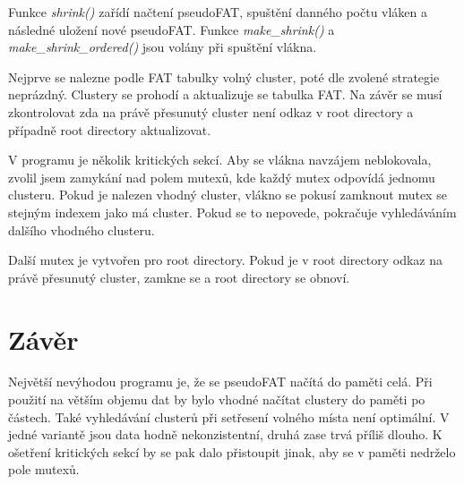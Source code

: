 Funkce \emph{shrink()} zařídí načtení pseudoFAT, spuštění danného počtu vláken a následné uložení nové pseudoFAT. Funkce \emph{make\_shrink()} a \emph{make\_shrink\_ordered()} jsou volány při spuštění vlákna.

Nejprve se nalezne podle FAT tabulky volný cluster, poté dle zvolené strategie neprázdný. Clustery se prohodí a aktualizuje se tabulka FAT. Na závěr se musí zkontrolovat zda na právě přesunutý cluster není odkaz v root directory a případně root directory aktualizovat.

V programu je několik kritických sekcí. Aby se vlákna navzájem neblokovala, zvolil jsem zamykání nad polem mutexů, kde každý mutex odpovídá jednomu clusteru. Pokud je nalezen vhodný cluster, vlákno se pokusí zamknout mutex se stejným indexem jako má cluster. Pokud se to nepovede, pokračuje vyhledáváním dalšího vhodného clusteru.

Další mutex je vytvořen pro root directory. Pokud je v root directory odkaz na právě přesunutý cluster, zamkne se a root directory se obnoví.


\chapter{Závěr}

Největší nevýhodou programu je, že se pseudoFAT načítá do paměti celá. Při použití na větším objemu dat by bylo vhodné načítat clustery do paměti po částech. Také vyhledávání clusterů při setřesení volného místa není optimální. V jedné variantě jsou data hodně nekonzistentní, druhá zase trvá příliš dlouho. K ošetření kritických sekcí by se pak dalo přistoupit jinak, aby se v paměti nedrželo pole mutexů.